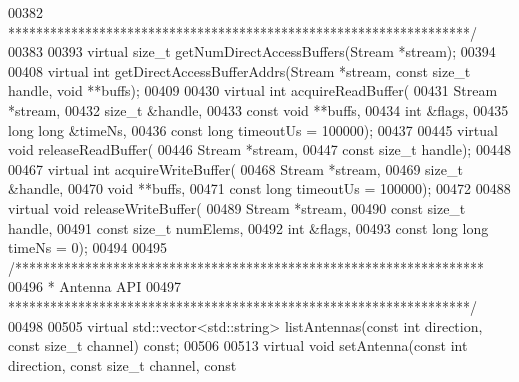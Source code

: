 \begin{DoxyCode}
00382 \textcolor{comment}{     ******************************************************************/}
00383 
00393     \textcolor{keyword}{virtual} \textcolor{keywordtype}{size\_t} getNumDirectAccessBuffers(Stream *stream);
00394 
00408     \textcolor{keyword}{virtual} \textcolor{keywordtype}{int} getDirectAccessBufferAddrs(Stream *stream, \textcolor{keyword}{const} \textcolor{keywordtype}{size\_t} handle, \textcolor{keywordtype}{void} **buffs);
00409 
00430     \textcolor{keyword}{virtual} \textcolor{keywordtype}{int} acquireReadBuffer(
00431         Stream *stream,
00432         \textcolor{keywordtype}{size\_t} &handle,
00433         \textcolor{keyword}{const} \textcolor{keywordtype}{void} **buffs,
00434         \textcolor{keywordtype}{int} &flags,
00435         \textcolor{keywordtype}{long} \textcolor{keywordtype}{long} &timeNs,
00436         \textcolor{keyword}{const} \textcolor{keywordtype}{long} timeoutUs = 100000);
00437 
00445     \textcolor{keyword}{virtual} \textcolor{keywordtype}{void} releaseReadBuffer(
00446         Stream *stream,
00447         \textcolor{keyword}{const} \textcolor{keywordtype}{size\_t} handle);
00448 
00467     \textcolor{keyword}{virtual} \textcolor{keywordtype}{int} acquireWriteBuffer(
00468         Stream *stream,
00469         \textcolor{keywordtype}{size\_t} &handle,
00470         \textcolor{keywordtype}{void} **buffs,
00471         \textcolor{keyword}{const} \textcolor{keywordtype}{long} timeoutUs = 100000);
00472 
00488     \textcolor{keyword}{virtual} \textcolor{keywordtype}{void} releaseWriteBuffer(
00489         Stream *stream,
00490         \textcolor{keyword}{const} \textcolor{keywordtype}{size\_t} handle,
00491         \textcolor{keyword}{const} \textcolor{keywordtype}{size\_t} numElems,
00492         \textcolor{keywordtype}{int} &flags,
00493         \textcolor{keyword}{const} \textcolor{keywordtype}{long} \textcolor{keywordtype}{long} timeNs = 0);
00494 
00495     \textcolor{comment}{/*******************************************************************}
00496 \textcolor{comment}{     * Antenna API}
00497 \textcolor{comment}{     ******************************************************************/}
00498 
00505     \textcolor{keyword}{virtual} std::vector<std::string> listAntennas(\textcolor{keyword}{const} \textcolor{keywordtype}{int} direction, \textcolor{keyword}{const} \textcolor{keywordtype}{size\_t} channel) \textcolor{keyword}{const};
00506 
00513     \textcolor{keyword}{virtual} \textcolor{keywordtype}{void} setAntenna(\textcolor{keyword}{const} \textcolor{keywordtype}{int} direction, \textcolor{keyword}{const} \textcolor{keywordtype}{size\_t} channel, \textcolor{keyword}{const} 

\end{DoxyCode}
